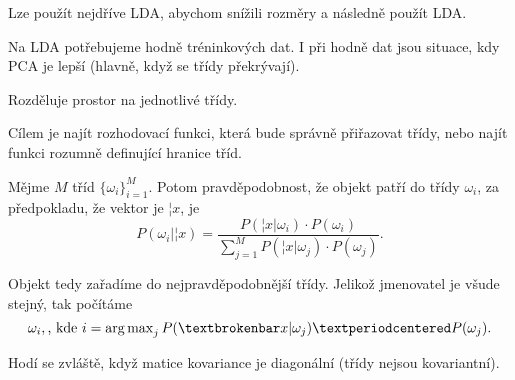 \documentclass[12pt]{article}					%
\begin{document}
    \begin{poznamka}
        Lze použít nejdříve LDA, abychom snížili rozměry a následně použít LDA.
    \end{poznamka}

    \begin{poznamka}
        Na LDA potřebujeme hodně tréninkových dat. I při hodně dat jsou situace, kdy PCA je lepší (hlavně, když se třídy překrývají).
    \end{poznamka}


    \begin{definice}
        Rozděluje prostor na jednotlivé třídy.

        Cílem je najít rozhodovací funkci, která bude správně přiřazovat třídy, nebo najít funkci rozumně definující hranice tříd.
    \end{definice}

    \begin{definice}
        Mějme $M$ tříd  $\{\omega_i\}_{i=1}^M$. Potom pravděpodobnost, že objekt patří do třídy $\omega_i$, za předpokladu, že vektor je $¦x$, je
        $$ P(\omega_i|¦x) = \frac{P(¦x|\omega_i)·P(\omega_i)}{\sum_{j=1}^M P(¦x|\omega_j)·P(\omega_j)}. $$ 

        Objekt tedy zařadíme do nejpravděpodobnější třídy. Jelikož jmenovatel je všude stejný, tak počítáme
        $$ \omega_i, \text{, kde } i = \argmax_j P(¦x|\omega_j)·P(\omega_j). $$ 

        Hodí se zvláště, když matice kovariance je diagonální (třídy nejsou kovariantní).
    \end{definice}
\end{document}
